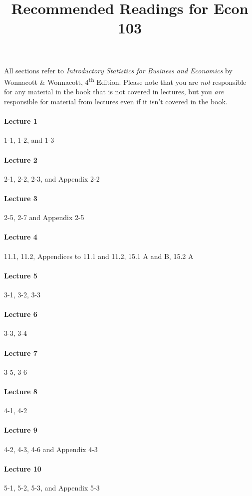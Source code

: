 \documentclass[12pt]{article}
\title{Recommended Readings for Econ 103}
\author{}
\date{}
\begin{document}
\maketitle

\noindent All sections refer to \emph{Introductory Statistics for Business and Economics} by Wonnacott \& Wonnacott, 4\textsuperscript{th} Edition.
Please note that you are \emph{not} responsible for any material in the book that is not covered in lectures, but you \emph{are} responsible for material from lectures even if it isn't covered in the book.

\paragraph{Lecture 1} 1-1, 1-2, and 1-3
\paragraph{Lecture 2} 2-1, 2-2, 2-3, and Appendix 2-2
\paragraph{Lecture 3} 2-5, 2-7 and Appendix 2-5
\paragraph{Lecture 4} 11.1, 11.2, Appendices to 11.1 and 11.2, 15.1 A and B, 15.2 A
\paragraph{Lecture 5} 3-1, 3-2, 3-3
\paragraph{Lecture 6} 3-3, 3-4
\paragraph{Lecture 7} 3-5, 3-6 
\paragraph{Lecture 8} 4-1, 4-2
\paragraph{Lecture 9} 4-2, 4-3, 4-6 and Appendix 4-3
\paragraph{Lecture 10} 5-1, 5-2, 5-3, and Appendix 5-3
\end{document}
